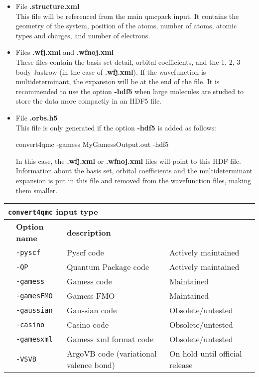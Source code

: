 \begin{itemize}
\begin{shade}
\end{shade}

 \item File \textbf{.structure.xml} \\
 This file will be referenced from the main qmcpack input. It contains the geometry of the system, position of the atoms, number of atoms, atomic types and charges, and number of electrons.
 
 \item Files \textbf{.wfj.xml} and \textbf{.wfnoj.xml}\\
 These files contain the basis set detail, orbital coefficients, and the 1, 2, 3 body Jastrow (in the case of \textbf{.wfj.xml}). If the wavefunction is multideterminant, the expansion will be at the end of the file. It is recommended to use the option \textbf{-hdf5} when large molecules are studied to store the data more compactly in an HDF5 file.
 
 \item File \textbf{.orbs.h5} \\
 This file is only generated if the option \textbf{-hdf5} is added as follows:
 \begin{shade}
  convert4qmc -gamess MyGamessOutput.out -hdf5
 \end{shade}
In this case,  the \textbf{.wfj.xml} or \textbf{.wfnoj.xml} files will point to this HDF file.  Information about the basis set, orbital coefficients and the multideterminant expansion is put in this file and removed from the wavefunction files, making them smaller. 

\end{itemize}



\begin{table}[h]
\begin{center}
\begin{tabularx}{\textwidth}{l l l l }
\hline
\multicolumn{4}{l}{\texttt{convert4qmc} input type} \\
\hline
   &   \bfseries Option name     &\bfseries description \\
   &   \texttt{-pyscf       } &  Pyscf code & Actively maintained\\
   &   \texttt{-QP          } &  Quantum Package code & Actively maintained\\
   &   \texttt{-gamess      } &  Gamess code & Maintained\\
   &   \texttt{-gamesFMO    } &  Gamess FMO & Maintained\\
   &   \texttt{-gaussian    } &  Gaussian code & Obsolete/untested \\
   &   \texttt{-casino      } &  Casino code & Obsolete/untested \\
   &   \texttt{-gamesxml    } &  Gamess xml format code  & Obsolete/untested\\
   &   \texttt{-VSVB        } &  ArgoVB code (variational valence bond) & On hold until official release\\
    \hline

    \end{tabularx}
\end{center}
\end{table}

